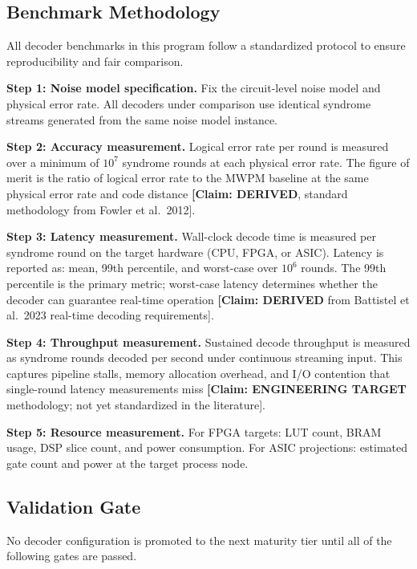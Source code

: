 \documentclass[conference]{IEEEtran}
\begin{document}
\subsection{Benchmark Methodology}

All decoder benchmarks in this program follow a standardized protocol to ensure reproducibility and fair comparison.

\textbf{Step 1: Noise model specification.} Fix the circuit-level noise model and physical error rate. All decoders under comparison use identical syndrome streams generated from the same noise model instance.

\textbf{Step 2: Accuracy measurement.} Logical error rate per round is measured over a minimum of $10^7$ syndrome rounds at each physical error rate. The figure of merit is the ratio of logical error rate to the MWPM baseline at the same physical error rate and code distance \textbf{[Claim: DERIVED}, standard methodology from Fowler et al.\ 2012].

\textbf{Step 3: Latency measurement.} Wall-clock decode time is measured per syndrome round on the target hardware (CPU, FPGA, or ASIC). Latency is reported as: mean, 99th percentile, and worst-case over $10^6$ rounds. The 99th percentile is the primary metric; worst-case latency determines whether the decoder can guarantee real-time operation \textbf{[Claim: DERIVED} from Battistel et al.\ 2023 real-time decoding requirements].

\textbf{Step 4: Throughput measurement.} Sustained decode throughput is measured as syndrome rounds decoded per second under continuous streaming input. This captures pipeline stalls, memory allocation overhead, and I/O contention that single-round latency measurements miss \textbf{[Claim: ENGINEERING TARGET} methodology; not yet standardized in the literature].

\textbf{Step 5: Resource measurement.} For FPGA targets: LUT count, BRAM usage, DSP slice count, and power consumption. For ASIC projections: estimated gate count and power at the target process node.

\subsection{Validation Gate}

No decoder configuration is promoted to the next maturity tier until all of the following gates are passed.
\end{document}

